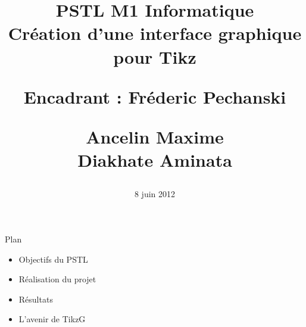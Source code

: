 \documentclass[landscape]{slides}
\title{
	{\large \textbf{PSTL M1 Informatique\\ Création d'une interface graphique pour Tikz}}
	\vspace{13mm}
	\begin{flushright}
{\normalsize Encadrant : Fréderic Pechanski\\}
\end{flushright}
	\vspace{20mm}
\begin{flushright}
	\begin{normalsize}
Ancelin Maxime\\
	Diakhate Aminata\\
\end{normalsize}
\end{flushright}	
}
\date{8 juin 2012}
\begin{document}
\maketitle

\begin{slide}
Plan
\begin{itemize}

\item Objectifs du PSTL

\item Réalisation du projet

\item Résultats

\item L'avenir de TikzG

%


\end{itemize}
\end{slide}

\begin{slide}

\end{slide}
\end{document}
